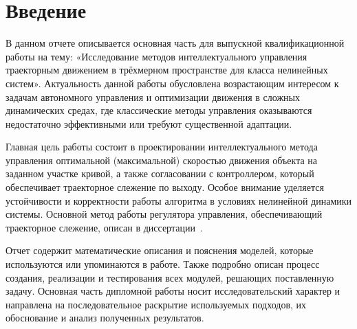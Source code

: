 \documentclass[11pt]{article}
\begin{document}
    

    \tableofcontents
    \newpage


    \section{Введение}

    В данном отчете описывается основная часть для выпускной квалификационной работы на тему: «Исследование методов интеллектуального управления траекторным движением в трёхмерном пространстве для класса нелинейных систем».
    Актуальность данной работы обусловлена возрастающим интересом к задачам автономного управления и оптимизации движения в сложных динамических средах, где классические методы управления оказываются недостаточно эффективными или требуют существенной адаптации.

    Главная цель работы состоит в проектировании интеллектуального метода управления оптимальной (максимальной) скоростью движения объекта на заданном участке кривой, а также согласовании с контроллером, который обеспечивает траекторное слежение по выходу.
    Особое внимание уделяется устойчивости и корректности работы алгоритма в условиях нелинейной динамики системы.
    Основной метод работы регулятора управления, обеспечивающий траекторное слежение, описан в диссертации~\cite{kim_algorithms}.

    Отчет содержит математические описания и пояснения моделей, которые используются или упоминаются в работе.
    Также подробно описан процесс создания, реализации и тестирования всех модулей, решающих поставленную задачу.
    Основная часть дипломной работы носит исследовательский характер и направлена на последовательное раскрытие используемых подходов, их обоснование и анализ полученных результатов.

    
    
    
    
    
    
    

    \printbibliography[heading=bibintoc,title={Список литературы}]
\end{document}
